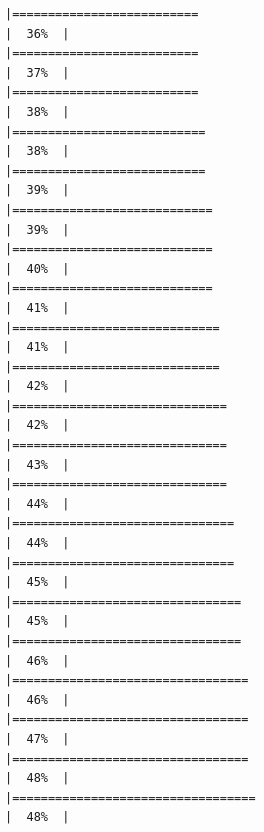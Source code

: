 \documentclass[
  bookmarksnumbered]{article}
\begin{document}
\begin{verbatim}
|==========================                                            |  36%  |                                                                              |==========================                                            |  37%  |                                                                              |==========================                                            |  38%  |                                                                              |===========================                                           |  38%  |                                                                              |===========================                                           |  39%  |                                                                              |============================                                          |  39%  |                                                                              |============================                                          |  40%  |                                                                              |============================                                          |  41%  |                                                                              |=============================                                         |  41%  |                                                                              |=============================                                         |  42%  |                                                                              |==============================                                        |  42%  |                                                                              |==============================                                        |  43%  |                                                                              |==============================                                        |  44%  |                                                                              |===============================                                       |  44%  |                                                                              |===============================                                       |  45%  |                                                                              |================================                                      |  45%  |                                                                              |================================                                      |  46%  |                                                                              |=================================                                     |  46%  |                                                                              |=================================                                     |  47%  |                                                                              |=================================                                     |  48%  |                                                                              |==================================                                    |  48%  |                                                                              
\end{verbatim}
\end{document}
